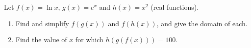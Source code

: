 Let $f(x)=\ln x$, $g(x)=e^x$ and $h(x)=x^2$ (real functions).
\begin{enumerate}
\item[(a)] Find and simplify $f(g(x))$ and $f(h(x))$, and give the domain of each.
\item[(b)] Find the value of $x$ for which $h(g(f(x)))=100$.
\end{enumerate}
